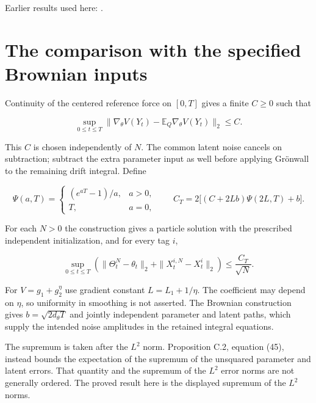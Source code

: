 \documentclass[11pt,a4paper]{article}
\begin{document}
Earlier results used here: \cite[Section~3.1.1]{LangevinLean2026IPLA}.

\section{\texorpdfstring{The comparison with the specified Brownian inputs}{The comparison with the specified Brownian inputs}}


Continuity of the centered reference force on \([0,T]\) gives a finite \(C\ge0\) such that

\[
\sup_{0\le t\le T}\|
 \nabla_\theta V(Y_t)-\mathbb E_Q\nabla_\theta V(Y_t)\|_2\le C.
\]

This \(C\) is chosen independently of \(N\). The common latent noise cancels on subtraction; subtract the extra parameter input as well before applying Grönwall to the remaining drift integral. Define

\[
\Psi(a,T)=\begin{cases}(e^{aT}-1)/a,&a>0,\\T,&a=0,\end{cases}
\qquad
C_T=2\big[(C+2Lb)\Psi(2L,T)+b\big].
\]

For each \(N>0\) the construction gives a particle solution with the prescribed independent initialization, and for every tag \(i\),

\[
\sup_{0\le t\le T}\left(
 \|\Theta_t^N-\theta_t\|_2+\|X_t^{i,N}-X_t^i\|_2\right)
 \le\frac{C_T}{\sqrt N}.
\]

For \(V=g_1+g_2^\eta\) use gradient constant \(L=L_1+1/\eta\). The coefficient may depend on \(\eta\), so uniformity in smoothing is not asserted. The Brownian construction gives \(b=\sqrt{2d_\theta T}\) and jointly independent parameter and latent paths, which supply the intended noise amplitudes in the retained integral equations.



The supremum is taken after the \(L^2\) norm. Proposition C.2, equation (45), instead bounds the expectation of the supremum of the unsquared parameter and latent errors. That quantity and the supremum of the \(L^2\) error norms are not generally ordered. The proved result here is the displayed supremum of the \(L^2\) norms.
\end{document}

